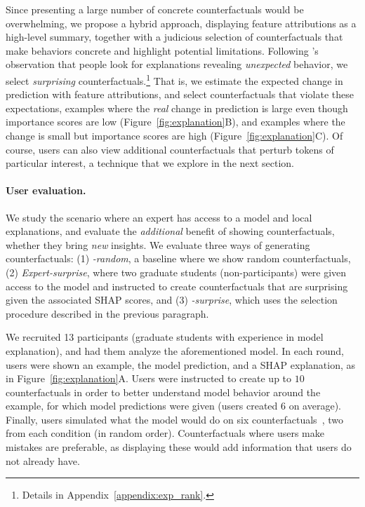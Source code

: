 Since presenting a large number of concrete counterfactuals would be overwhelming, we propose a hybrid approach, displaying feature attributions as a high-level summary, together with a judicious selection of \sysname counterfactuals that make behaviors concrete and highlight potential limitations.
Following \citet{miller}'s observation that people look for explanations revealing \emph{unexpected} behavior, we select \emph{surprising} counterfactuals.\footnote{
Details in Appendix~\ref{appendix:exp_rank}.}
That is, we estimate the expected change in prediction with feature attributions, and select counterfactuals that violate these expectations, \ie examples where the \emph{real} change in prediction is large even though importance scores are low (Figure~\ref{fig:explanation}B), and examples where the change is small but importance scores are high (Figure~\ref{fig:explanation}C). 
Of course, users can also view additional counterfactuals that perturb tokens of particular interest, a technique that we explore in the next section.


\newcommand{\cshap}{\emph{\sysname-surprise}\xspace}
\newcommand{\crandom}{\emph{\sysname-random}\xspace}
\newcommand{\chuman}{\emph{Expert-surprise}\xspace}

\paragraph{User evaluation.} We study the scenario where an expert has access to a model and local explanations, and evaluate the \emph{additional} benefit of showing counterfactuals, \ie whether they bring \emph{new} insights. 
We evaluate three ways of generating counterfactuals: (1) \crandom, a baseline where we show random \sysname{} counterfactuals, (2) \chuman, where two graduate students (non-participants) were given access to the model and instructed to create counterfactuals that are surprising given the associated SHAP scores, and (3) \cshap, which uses the selection procedure described in the previous paragraph.

We recruited 13 participants (graduate students with experience in model explanation), and had them analyze the aforementioned \qqp model. In each round, users were shown an example, the model prediction, and a SHAP explanation, as in Figure~\ref{fig:explanation}A. Users were instructed to create up to $10$ counterfactuals in order to better understand model behavior around the example, for which model predictions were given (users created $6$ on average). 
Finally, users simulated what the model would do on six counterfactuals~\cite{hase2020evaluating}, two from each condition (in random order). Counterfactuals where users make mistakes are preferable, as displaying these would add information that users do not already have.



